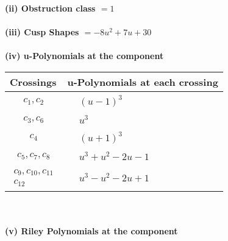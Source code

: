 \documentclass[1p]{elsarticle_modified}
\theoremstyle{definition}
\begin{document}
\flushleft \textbf{(ii) Obstruction class $= 1$}\\~\\
\flushleft \textbf{(iii) Cusp Shapes $= -8 u^2+7 u+30$}\\~\\
\newpage\renewcommand{\arraystretch}{1}
\flushleft \textbf{(iv) u-Polynomials at the component}\newline \\
\begin{tabular}{m{50pt}|m{274pt}}
Crossings & \hspace{64pt}u-Polynomials at each crossing \\
\hline $$\begin{aligned}c_{1},c_{2}\end{aligned}$$&$\begin{aligned}
&(u-1)^3
\end{aligned}$\\
\hline $$\begin{aligned}c_{3},c_{6}\end{aligned}$$&$\begin{aligned}
&u^3
\end{aligned}$\\
\hline $$\begin{aligned}c_{4}\end{aligned}$$&$\begin{aligned}
&(u+1)^3
\end{aligned}$\\
\hline $$\begin{aligned}c_{5},c_{7},c_{8}\end{aligned}$$&$\begin{aligned}
&u^3+u^2-2 u-1
\end{aligned}$\\
\hline $$\begin{aligned}c_{9},c_{10},c_{11}\\c_{12}\end{aligned}$$&$\begin{aligned}
&u^3- u^2-2 u+1
\end{aligned}$\\
\hline
\end{tabular}\\~\\
\newpage\renewcommand{\arraystretch}{1}
\flushleft \textbf{(v) Riley Polynomials at the component}\newline \\
\end{document}
